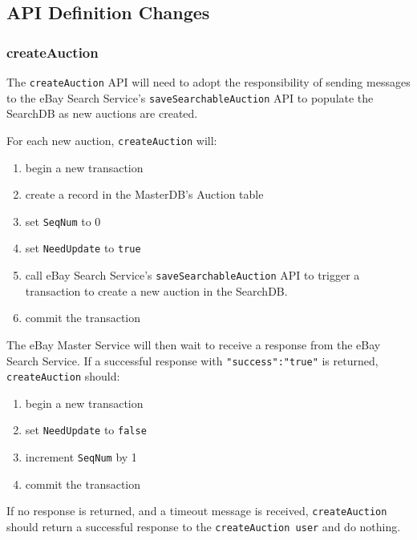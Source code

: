 \documentclass[12pt,a4paper]{article}
\begin{document}
\pagebreak
\subsection{API Definition Changes}

\subsubsection{createAuction}

The \texttt{createAuction} API will need to adopt the responsibility of sending messages to the eBay Search Service's
\texttt{saveSearchableAuction} API to populate the SearchDB as new auctions are created. 
\vspace{\baselineskip}

For each new auction, \texttt{createAuction} will:

\begin{enumerate}
    \item begin a new transaction
    \item create a record in the MasterDB's Auction table
    \item set \texttt{SeqNum} to 0
    \item set \texttt{NeedUpdate} to \texttt{true}
    \item call eBay Search Service's \texttt{saveSearchableAuction} API to trigger a transaction to create 
    a new auction in the SearchDB.
    \item commit the transaction
\end{enumerate}

The eBay Master Service will then wait to receive a response from the eBay Search Service. 
If a successful response with \texttt{"success":"true"} is returned, 
\texttt{createAuction} should:

\begin{enumerate}
    \item begin a new transaction
    \item set \texttt{NeedUpdate} to \texttt{false}
    \item increment \texttt{SeqNum} by 1
    \item commit the transaction
\end{enumerate}

If no response is returned, and a timeout message is received, \texttt{createAuction} 
should return a successful response to the \texttt{createAuction user} and do nothing.


\end{document}
